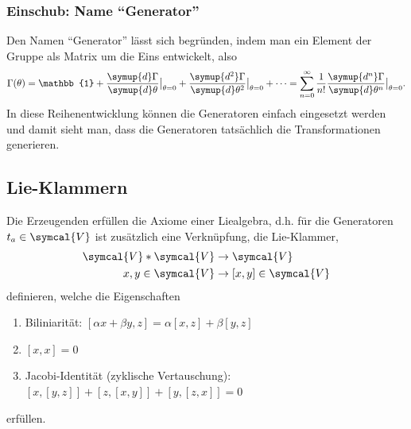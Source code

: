 \documentclass[
  captions=tableheading,  %
  titlepage=firstiscover, %
]{scrartcl}
\begin{document}
\subsubsection{Einschub: Name \enquote{Generator}}
Den Namen \enquote{Generator} lässt sich begründen, indem man ein Element der Gruppe als Matrix um die Eins entwickelt, also 
\begin{equation*}
  \Gamma(\theta) = \mathbb{1} + \frac{\symup{d}\Gamma}{\symup{d} \theta} \big |_{\theta = 0} + 
  \frac{\symup{d^2}\Gamma}{\symup{d} \theta^2} \big |_{\theta = 0} + \cdots  = \sum_{n=0}^{\infty}\frac{1}{n!} 
  \frac{\symup{d^n}\Gamma}{\symup{d} \theta^n} \big |_{\theta = 0}.
\end{equation*}
In diese Reihenentwicklung können die Generatoren einfach eingesetzt werden und damit sieht man, dass 
die Generatoren tatsächlich die Transformationen generieren.
\subsection{Lie-Klammern}
Die Erzeugenden erfüllen die Axiome einer Liealgebra, d.h. für die Generatoren $t_a \in \symcal{V}$ ist 
zusätzlich eine Verknüpfung, die Lie-Klammer, 
\begin{align*}
  \symcal{V} * \symcal{V} &\to \symcal{V} \\
  x,y \in \symcal{V}      &\to [x,y] \in \symcal{V}
\end{align*}
definieren, welche die Eigenschaften 
\begin{enumerate}
  \item Biliniarität: $[\alpha x + \beta y, z] = \alpha [x,z] + \beta [y,z]$
  \item $[x,x] = 0$
  \item Jacobi-Identität (zyklische Vertauschung): $[x, [y,z]] + [z,[x,y]] + [y,[z,x]] = 0$
\end{enumerate}
erfüllen.
\end{document}
